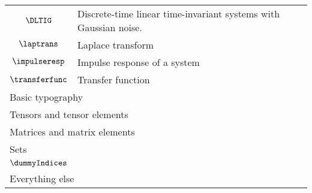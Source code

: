 \begin{longtable}{cl}
 $\DLTIG$ &  Discrete-time linear time-invariant systems with Gaussian noise.\\ 
 $\laptrans$ &  Laplace transform\\ 
 $\impulseresp$ &  Impulse response of a system\\ 
 $\transferfunc$ &  Transfer function\\ 
 \multicolumn{2}{l}{Basic typography}\\ 
 \hline
\hline
\multicolumn{2}{l}{Tensors and tensor elements}\\ 
 \hline
\multicolumn{2}{l}{Matrices and matrix elements}\\ 
 \hline
\multicolumn{2}{l}{Sets}\\ 
 \hline
$\dummyIndices$ & \\ 
 \multicolumn{2}{l}{Everything else}\\ 
 \hline
\end{longtable}
